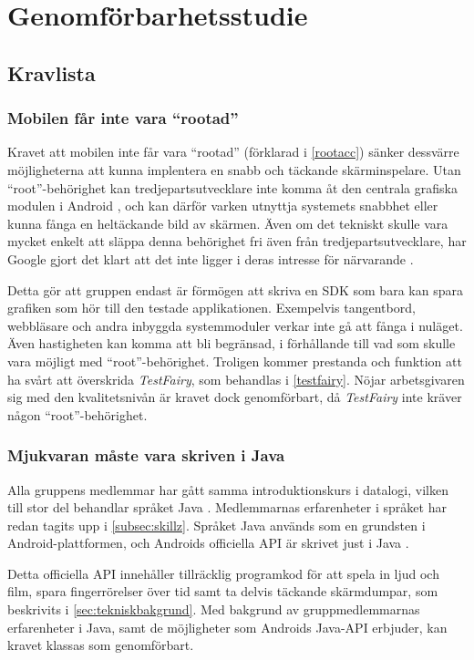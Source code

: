 \section{Genomförbarhetsstudie}
\subsection{Kravlista}
\subsubsection{Mobilen får inte vara ``rootad''}
Kravet att mobilen inte får vara ``rootad'' (förklarad i \ref{rootacc}) sänker dessvärre möjligheterna att kunna implentera en snabb och täckande skärminspelare. Utan ``root''-behörighet kan tredjepartsutvecklare inte komma åt den centrala grafiska modulen i Android \parencite{adoc}, och kan därför varken utnyttja systemets snabbhet eller kunna fånga en heltäckande bild av skärmen. Även om det tekniskt skulle vara mycket enkelt att släppa denna behörighet fri även från tredjepartsutvecklare, har Google gjort det klart att det inte ligger i deras intresse för närvarande \parencite{uhno}.

Detta gör att gruppen endast är förmögen att skriva en SDK som bara kan spara grafiken som hör till den testade applikationen. Exempelvis tangentbord, webbläsare och andra inbyggda systemmoduler verkar inte gå att fånga i nuläget. Även hastigheten kan komma att bli begränsad, i förhållande till vad som skulle vara möjligt med ``root''-behörighet. Troligen kommer prestanda och funktion att ha svårt att överskrida \textit{TestFairy}, som behandlas i \ref{testfairy}. Nöjar arbetsgivaren sig med den kvalitetsnivån är kravet dock genomförbart, då \textit{TestFairy} inte kräver någon ``root''-behörighet.

\subsubsection{Mjukvaran måste vara skriven i Java}
Alla gruppens medlemmar har gått samma introduktionskurs i datalogi, vilken till stor del behandlar språket Java \parencite{inda}. Medlemmarnas erfarenheter i språket har redan tagits upp i \ref{subsec:skillz}. Språket Java används som en grundsten i Android-plattformen, och Androids officiella API är skrivet just i Java \parencite{adoc}. 

Detta officiella API innehåller tillräcklig programkod för att spela in ljud och film, spara fingerrörelser över tid samt ta delvis täckande skärmdumpar, som beskrivits i \ref{sec:tekniskbakgrund}. Med bakgrund av gruppmedlemmarnas erfarenheter i Java, samt de möjligheter som Androids Java-API erbjuder, kan kravet klassas som genomförbart.

